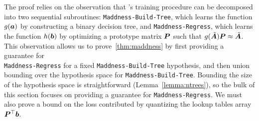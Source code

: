 The proof relies on the observation that \ours's training procedure can be decomposed into two sequential subroutines: \texttt{Maddness-Build-Tree}, which learns the function $g(\a)$ by constructing a binary decision tree, and \texttt{Maddness-Regress}, which learns the function $h(\b)$ by optimizing a prototype matrix $\P$ such that $g(\tilde{\A}) \P \approx \tilde{\A}$.
This observation allows us to prove~\ref{thm:maddness} by first providing a guarantee for \\ \texttt{Maddness-Regress} for a fixed \texttt{Maddness-Build-Tree} hypothesis, and then union bounding over the hypothesis space for \texttt{Maddness-Build-Tree}. Bounding the size of the hypothesis space is straightforward (Lemma~\ref{lemma:ntrees}), so the bulk of this section focuses on providing a guarantee for \texttt{Maddness-Regress}. We must also prove a bound on the loss contributed by quantizing the lookup tables array $\P^\top \b$. %

